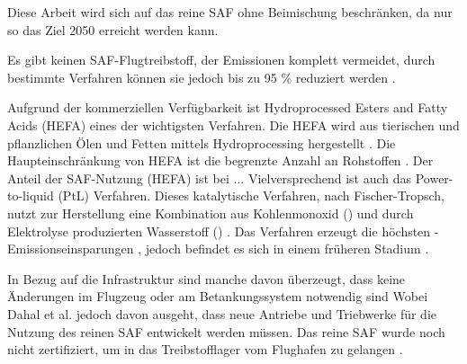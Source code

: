 Diese Arbeit wird sich auf das reine SAF ohne Beimischung beschränken, da nur so das Ziel 2050 erreicht werden kann.

Es gibt keinen SAF-Flugtreibstoff, der Emissionen komplett vermeidet, durch bestimmte Verfahren können sie jedoch 
bis zu 95 \% reduziert werden \cite{icao_saf_conversion_2024}.


 
Aufgrund der kommerziellen Verfügbarkeit ist Hydroprocessed Esters and Fatty Acids (HEFA) eines der wichtigsten Verfahren.
Die HEFA wird aus tierischen und pflanzlichen Ölen und Fetten mittels Hydroprocessing hergestellt \cite{bauen2020sustainable}. 
Die Haupteinschränkung von HEFA ist die begrenzte Anzahl an Rohstoffen \cite{bauen2020sustainable}.
Der Anteil der SAF-Nutzung (HEFA) ist bei ...
Vielversprechend ist auch das Power-to-liquid (PtL) Verfahren.
Dieses katalytische Verfahren, nach Fischer-Tropsch, nutzt zur Herstellung eine Kombination aus Kohlenmonoxid () und durch Elektrolyse produzierten Wasserstoff () \cite{bauen2020sustainable}.
Das Verfahren erzeugt die höchsten -Emissionseinsparungen \cite{de2017life}, jedoch befindet es sich in einem früheren Stadium \cite{bauen2020sustainable}.

In Bezug auf die Infrastruktur sind manche davon überzeugt, dass keine Änderungen im Flugzeug oder am Betankungssystem notwendig sind \cite{sky2020hydrogen} %
Wobei Dahal et al. \cite{dahal2021techno} jedoch davon ausgeht, dass neue Antriebe und Triebwerke für die Nutzung des reinen SAF entwickelt werden müssen.
Das reine SAF wurde noch nicht zertifiziert, um in das Treibstofflager vom Flughafen zu gelangen \cite{iata_saf_2024}.


